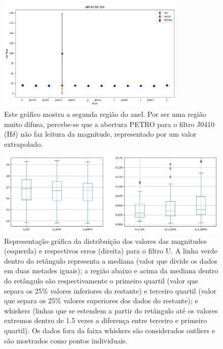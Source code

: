 \begin{figure}[!h]
  \centering 
  \includegraphics[width=0.8\textwidth]{Imagens/AM0330324index9.png} 
  \caption[Magnitudes da galáxia AM 0330-324.]{Este gráfico mostra a segunda região do anel. Por ser uma região muito difusa, percebe-se que a abertura PETRO para o filtro J0410 (H$\delta$) não faz leitura da magnitude, representado por um valor extrapolado.}
  \label{fig:AM0330324index9} 
\end{figure}

\begin{figure}[h]
  \centering 
  \includegraphics[width=1.0\textwidth]{Imagens/boxplot_aberturas_err.png}
  \caption[Distribuição dos valores das magnitudes e respectivos erros pela representação gráfica \emph{boxplot} e identificação de dados extrapolados para o filtro U.]{Representação gráfica da distribuição dos valores das magnitudes (esquerda) e respectivos erros (direita) para o filtro U. A linha verde dentro do retângulo representa a mediana (valor que divide os dados em duas metades iguais); a região abaixo e acima da mediana dentro do retângulo são respectivamente o primeiro quartil (valor que separa os 25\% valores inferiores do restante) e terceiro quartil (valor que separa os 25\% valores superiores dos dados do restante); e whiskers (linhas que se estendem a partir do retângulo até os valores extremos dentro de 1.5 vezes a diferença entre terceiro e primeiro quartil). Os dados fora da faixa whiskers são considerados outliers e são mostrados como pontos individuais.}
  \label{fig:boxplot_aberturas} 
\end{figure}

